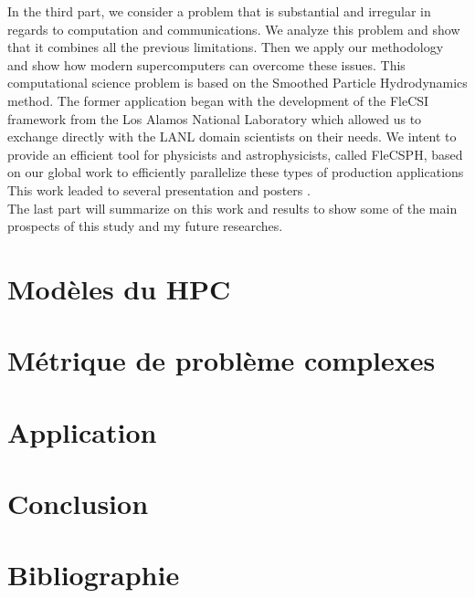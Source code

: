\documentclass[12pt,a4paper]{report}
\begin{document}
In the third part, we consider a problem that is substantial and irregular in regards to computation and communications.
We analyze this problem and show that it combines all the previous limitations. 
Then we apply our methodology and show how modern supercomputers can overcome these issues. 
This computational science problem is based on the Smoothed Particle Hydrodynamics method.
The former application began with the development of the FleCSI framework from the Los Alamos National Laboratory which allowed us to exchange directly with the LANL domain scientists on their needs.
We intent to provide an efficient tool for physicists and astrophysicists, called FleCSPH, based on our global work to efficiently parallelize these types of production applications
This work leaded to several presentation and posters \cite{debrye20162HOT,loiseau2017SC}.\\

The last part will summarize on this work and results to show some of the main prospects of this study and my future researches.

\section{Modèles du HPC}

\section{Métrique de problème complexes}

\section{Application}

\section{Conclusion}


\section*{Bibliographie}


\end{document}
